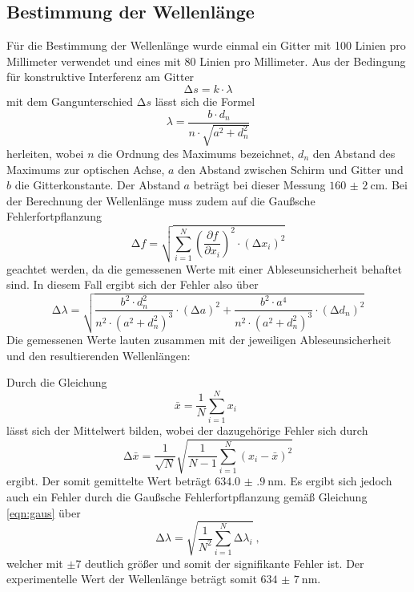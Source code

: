 \subsection{Bestimmung der Wellenlänge}
Für die Bestimmung der Wellenlänge wurde einmal ein Gitter mit 100 Linien pro Millimeter
verwendet und eines mit 80 Linien pro Millimeter.
Aus der Bedingung für konstruktive Interferenz am Gitter
\begin{equation}
  \increment s = k \cdot \lambda
\end{equation}
mit dem Gangunterschied $\increment s$ lässt sich die Formel
\begin{equation}
  \lambda = \frac{b \cdot d_n}{n \cdot \sqrt{a^2+d_n^2}}
\end{equation}
herleiten, wobei $n$ die Ordnung des Maximums bezeichnet, $d_n$ den Abstand des
Maximums zur optischen Achse, $a$ den Abstand zwischen Schirm und Gitter und $b$ die
Gitterkonstante. Der Abstand $a$ beträgt bei dieser Messung $\SI{160(2)}{\centi\meter}$.
Bei der Berechnung der Wellenlänge muss zudem auf die Gaußsche Fehlerfortpflanzung
\begin{equation}
  \increment f = \sqrt{ \sum_{i=1}^N \left( \frac{\partial f}{\partial x_i}\right)^2
  \cdot (\increment x_i)^2  }
  \label{eqn:gaus}
\end{equation}
geachtet werden, da die gemessenen Werte mit einer Ableseunsicherheit behaftet sind.
In diesem Fall ergibt sich der Fehler also über
\begin{equation}
  \increment \lambda = \sqrt{\frac{b^2 \cdot d^2_n}{n^2 \cdot (a^2+d_n^2)^3}\cdot (\increment a)^2
  + \frac{b^2 \cdot a^4}{n^2 \cdot (a^2+d_n^2)^3}\cdot (\increment d_n)^2 }
\end{equation}
Die gemessenen Werte lauten zusammen mit der jeweiligen Ableseunsicherheit und den resultierenden
Wellenlängen:

Durch die Gleichung
\begin{equation}
  \bar{x} = \frac{1}{N} \sum_{i=1}^{N} x_i \: \:
  \label{eqn:mit}
\end{equation}
\noindent lässt sich der Mittelwert bilden, wobei der dazugehörige Fehler sich durch
\begin{equation}
  \increment \bar{x} = \frac{1}{\sqrt{N}} \sqrt{ \frac{1}{N-1} \sum_{i=1}^N
  (x_i - \bar{x})^2}
  \label{eqn:mitf}
\end{equation}
ergibt. Der somit gemittelte Wert beträgt $\SI{634.0(9)}{\nano\meter}$.
Es ergibt sich jedoch auch ein Fehler durch die Gaußsche Fehlerfortpflanzung gemäß Gleichung
\ref{eqn:gaus} über
\begin{equation}
  \increment \lambda = \sqrt{\frac{1}{N^2} \sum_{i=1}^{N} \increment \lambda_i} \:,
\end{equation}
welcher mit $\pm 7$ deutlich größer und somit der signifikante Fehler ist. Der experimentelle Wert der
Wellenlänge beträgt somit $\SI{634(7)}{\nano\meter}$.
